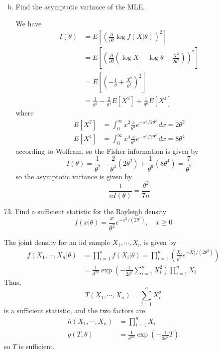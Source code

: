 \documentclass{article}
\begin{document}
\begin{itemize}
\begin{enumerate}[a.]
\begin{soln}
				\end{soln}

			\item Find the asymptotic variance of the MLE.
				\begin{soln}
					We have
					\begin{align*}
						I(\theta) &= E\left[ \left(\frac{\partial}{\partial\theta}\log f(X|\theta)\right)^2 \right] \\
						&= E\left[\left( \frac{\partial}{\partial\theta}\left( \log X-\log \theta-\frac{X^2}{2\theta^2} \right)\right)^2 \right] \\
						&= E\left[ \left(-\frac{1}{\theta}+\frac{X^2}{\theta^3}\right)^2 \right] \\
						&= \frac{1}{\theta^2}-\frac{2}{\theta^4}E[X^2]+\frac{1}{\theta^6}E[X^4]
					\end{align*} where 
					\begin{align*}
						E[X^2] &= \int_0^\infty x^2\frac{x}{\theta^2}e^{-x^2/2\theta^2}\, dx=2\theta^2 \\
						E[X^4] &= \int_0^\infty x^4 \frac{x}{\theta^2}e^{-x^2/2\theta^2}\, dx = 8\theta^4
					\end{align*} according to Wolfram, so the Fisher information is given by \[I(\theta)=\frac{1}{\theta^2}-\frac{2}{\theta^4}(2\theta^2)+\frac{1}{\theta^6}(8\theta^4)=\frac{7}{\theta^2}\] so the asymptotic variance is given by \[\frac{1}{nI(\theta)}=\frac{\theta^2}{7n}\]
					
				\end{soln}
				
		\end{enumerate}

	\item[73.] Find a sufficient statistic for the Rayleigh density \[f(x|\theta)=\frac{x}{\theta^2}e^{-x^2/(2\theta^2)}, \quad x\ge 0\]
		\begin{soln}
			The joint density for an iid sample $X_1, \cdots, X_n$ is given by 
			\begin{align*}
				f(X_1, \cdots, X_n|\theta) &= \prod_{i=1}^n f(X_i|\theta) = \prod_{i=1}^n \left( \frac{X_i}{\theta^2} e^{-X_i^2/(2\theta^2)} \right) \\
					&= \frac{1}{\theta^{2n}}\exp{\left( -\frac{1}{2\theta^2}\sum_{i=1}^{n}X_i^2 \right)} \prod_{i=1}^n X_i 
			\end{align*}
			Thus, \[T(X_1, \cdots, X_n) = \sum_{i=1}^{n} X_i^2\] is a sufficient statistic, and the two factors are 
			\begin{align*}
				h(X_1, \cdots, X_n) &= \prod_{i=1}^n X_i \\
				g(T, \theta) &= \frac{1}{\theta^{2n}}\exp{\left( -\frac{1}{2\theta^2}T \right)}
			\end{align*} 
			so $T$ is sufficient.
			

\end{soln}
\end{itemize}
\end{document}
